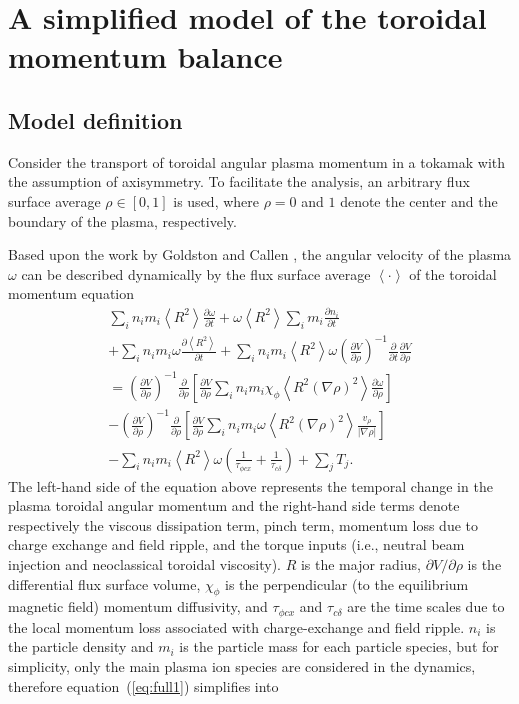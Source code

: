 \documentclass[12pt]{iopart}
\begin{document}
 \section{A simplified model of  the toroidal momentum balance }
 \label{MHW}
 
\subsection{Model definition}
Consider the transport of toroidal angular plasma momentum in a tokamak with the assumption of axisymmetry.  To facilitate the analysis, an arbitrary flux surface average $\rho \in [0,1]$ is used, where $\rho = 0$ and $1$ denote the center and the boundary of the plasma, respectively.  

Based upon the work by Goldston \cite{Goldston86}  and Callen  \cite{Callen09}, the angular velocity of the plasma $\omega$ can be described dynamically by the flux surface average $\left<\cdot\right>$ of the toroidal momentum equation 
\begin{eqnarray}
  \sum_i n_i m_i \left<R^2\right> \frac{\partial \omega}{\partial t}
  + \omega \left<R^2\right> \sum_i m_i \frac{\partial n_i}{\partial t} \nonumber \\
  + \sum_i n_i m_i \omega \frac{\partial \left<R^2\right>}{\partial t}
  + \sum_i n_i m_i \left<R^2\right> \omega \left( \frac{\partial V}{\partial\rho}\right)^{-1} \frac{\partial}{\partial t} \frac{\partial V}{\partial \rho} \nonumber \\
  = \left( \frac{\partial V}{\partial\rho}\right)^{-1}\frac{\partial}{\partial \rho} \left[\frac{\partial V}{\partial \rho}\sum_i n_i m_i \chi_\phi \left< R^2 (\nabla \rho)^2\right> \frac{\partial\omega}{\partial\rho}\right] \nonumber \\
  - \left( \frac{\partial V}{\partial\rho}\right)^{-1}\frac{\partial}{\partial \rho} \left[\frac{\partial V}{\partial \rho}\sum_i n_i m_i \omega \left< R^2 (\nabla \rho)^2\right> \frac{v_\rho}{|\nabla\rho|}\right] \nonumber \\
  - \sum_i n_i m_i \left< R^2\right> \omega \left( \frac{1}{\tau_{\phi cx}} + \frac{1}{\tau_{c\delta}}\right) + \sum_j T_j.
\label{eq:full1}
\end{eqnarray}
The left-hand side of the equation above represents the temporal change in the plasma toroidal angular momentum and the right-hand side terms denote respectively the viscous dissipation term, pinch term, momentum loss due to charge exchange and field ripple, and the torque inputs (i.e., neutral beam injection and neoclassical toroidal viscosity). $R$ is the major radius, $\partial V/\partial\rho$ is the differential flux surface volume, $\chi_\phi$ is the perpendicular (to the equilibrium magnetic field) momentum diffusivity, and $\tau_{\phi c x}$ and $\tau_{c\delta}$ are the time scales due to the local momentum loss associated with charge-exchange and field ripple. $n_i$ is the particle density and $m_i$ is the particle mass for each particle species, but for simplicity, only the main plasma ion species are considered in the dynamics, therefore equation~(\ref{eq:full1}) simplifies into
\end{document}
